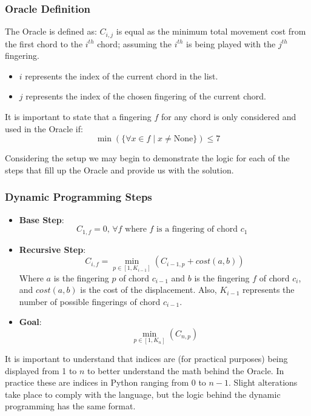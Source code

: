 \documentclass[conference]{IEEEtran}
\begin{document}
\subsubsection{Oracle Definition}
The Oracle is defined as: \(C_{i,j}\) is equal as the minimum total movement cost from the first chord to the \(i^{th}\) chord; assuming the \(i^{th}\) is being played with the \(j^{th}\) fingering.
\begin{itemize}
    \item \(i\) represents the index of the current chord in the list.
    \item \(j\) represents the index of the chosen fingering of the current chord.
\end{itemize}

It is important to state that a fingering \(f\) for any chord is only considered and used in the Oracle if:
\[ \min(\{\forall x \in f \mid x \neq \text{None}\}) \leq 7 \]

Considering the setup we may begin to demonstrate the logic for each of the steps that fill up the Oracle and provide us with the solution. 

\subsubsection{Dynamic Programming Steps}
\begin{itemize}
    \item \textbf{Base Step}: 
    \[ C_{1,f} = 0 \text{, \(\forall f\) where \(f\) is a fingering of chord \(c_1\) }\]

    \item \textbf{Recursive Step}: 
    \[ C_{i,f} = \min_{p \in [1, K_{i-1}]}(C_{i-1, p} + cost(a, b))\]
    Where \(a\) is the fingering \(p\) of chord \(c_{i-1}\) and \(b\) is the fingering \(f\) of chord \(c_i\), and \(cost(a,b)\) is the cost of the displacement. Also, \(K_{i-1}\) represents the number of possible fingerings of chord \(c_{i-1}\). 

    \item \textbf{Goal}:
    \[ \min_{p \in [1, K_{n}]}(C_{n, p})\]
\end{itemize}

It is important to understand that indices are (for practical purposes) being displayed from 1 to $n$ to better understand the math behind the Oracle. In practice these are indices in Python ranging from 0 to $n-1$. Slight alterations take place to comply with the language, but the logic behind the dynamic programming has the same format.
\end{document}
